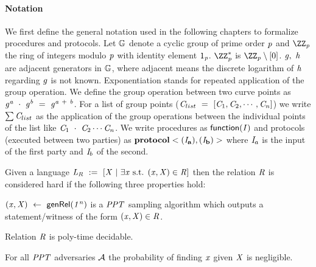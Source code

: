 \paragraph{Notation}
We first define the general notation used in the following chapters to formalize procedures and protocols.
Let $\mathbb{G}$ denote a cyclic group of prime order $\mathit{p}$ and $\cnstIntegersPrime{\varPrime}$ the ring of integers modulo $\mathit{p}$ with identity element $1_{\mathit{p}}$.
$\cnstIntegersPrimeWithoutZero{\varPrime}$ is $\cnstIntegersPrime{\varPrime} \opExcluding \funList{0}$.
$\mathit{g} ,~ \mathit{h}$ are adjacent generators in $\mathbb{G}$, where adjacent means the discrete logarithm of $\mathit{h}$ regarding $\mathit{g}$ is not known.
Exponentiation stands for repeated application of the group operation.
We define the group operation between two curve points as $\mathit{g}^{\mathit{a}} ~\cdot~ \mathit{g}^{\mathit{b}} ~=~ \mathit{g}^{\mathit{a} ~+~ \mathit{b}}$.
For a list of group points ($\mathit{C}_{list} ~=~ [\mathit{C}_1,\mathit{C}_2,\cdots,\mathit{C}_n]$) we write $\sum \mathit{C}_{list}$ as the application of the group operations between the individual points of the list like $\mathit{C}_1 ~\cdot~ \mathit{C}_2 \cdots \mathit{C}_n$.
We write procedures as $\mathsf{function(\mathit{I})}$ and protocols (executed between two parties) as $\mathbf{protocol<(\mathit{I}_a),(\mathit{I}_b)>}$ where $\mathit{I}_a$ is the input of the first party and $\mathit{I}_b$ of the second.

\begin{definition}\label{def:pre:hard-relation}
    Given a language $\mathit{L}_{\mathit{R}} ~:=~ [\mathit{X} ~|~ \exists \mathit{x} \text{ s.t. } (\mathit{x},\mathit{X}) \in \mathit{R}]$ then the relation $\mathit{R}$ is considered hard if the following three properties hold:
    \begin{asparaenum}
        \item $(\mathit{x}, \mathit{X}) ~\leftarrow~ \mathsf{genRel}(\mathit{1^n})$ is a $\mathit{PPT}$ sampling algorithm which outputs a statement/witness of the form $(\mathit{x}, \mathit{X}) \in \mathit{R}$.
        \item Relation $\mathit{R}$ is poly-time decidable.
        \item For all $\mathit{PPT}$ adversaries $\mathcal{A}$ the probability of finding $\mathit{x}$ given $\mathit{X}$ is negligible.
    \end{asparaenum}
\end{definition}

